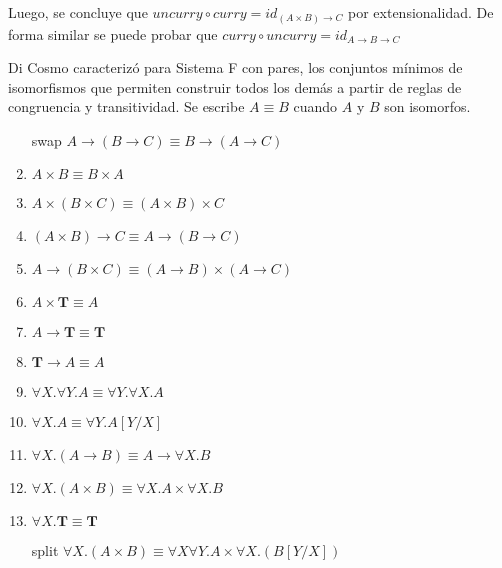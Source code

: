 Luego, se concluye que $uncurry \circ curry = id_{(A \times B) \rightarrow C}$ por extensionalidad.
De forma similar se puede probar que $curry \circ uncurry = id_{A \rightarrow B \rightarrow C}$

Di Cosmo \cite{MSCSSurvey05} caracterizó para Sistema F con pares, los conjuntos mínimos de isomorfismos que permiten construir todos los demás a partir de reglas de congruencia y transitividad.
Se escribe $A \equiv B$ cuando $A$ y $B$ son isomorfos.

\begin{table}[H]
	\centering
	\begin{minipage}{0.7\linewidth}
		\begin{enumerate}
			\item[swap] $A \rightarrow (B \rightarrow  C) \equiv B \rightarrow (A \rightarrow  C)$ 
			
			\item $A \times B \equiv B \times A$ 
			\item $A \times (B \times C) \equiv (A \times B) \times C$
			\item $(A \times B) \rightarrow C \equiv A \rightarrow (B \rightarrow C)$
			\item $A \rightarrow (B \times C) \equiv (A \rightarrow B) \times (A \rightarrow C)$
			
			\item $A \times \textbf{T} \equiv A$
			\item $A \rightarrow \textbf{T} \equiv \textbf{T}$
			\item $\textbf{T} \rightarrow A \equiv A$ 
			
			\item $\forall X. \forall Y. A \equiv \forall Y. \forall X. A$ 
			\item $\forall X.A \equiv \forall Y.A [Y/X]$
			\item $\forall X. (A \rightarrow B) \equiv A \rightarrow \forall X.B$ 
			\item $\forall X. (A \times B) \equiv \forall X.A \times \forall X.B$
			\item $\forall X.\textbf{T} \equiv \textbf{T}$ 
			
			\item[split] $\forall X. (A \times B) \equiv \forall X \forall Y.A \times \forall X. (B [Y/X])$ 
			
		\end{enumerate}
		

\end{minipage}
\end{table}
